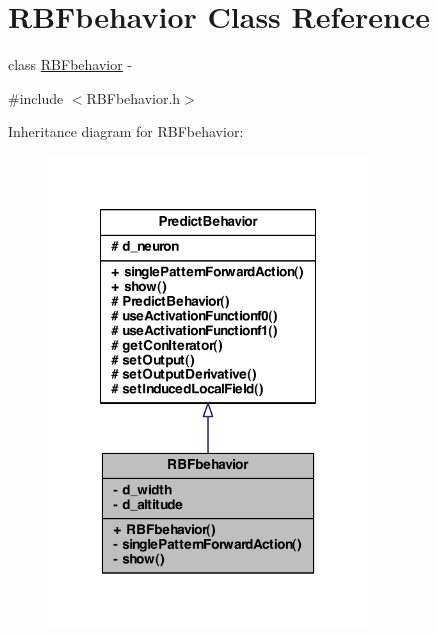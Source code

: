 \hypertarget{class_r_b_fbehavior}{
\section{RBFbehavior Class Reference}
\label{class_r_b_fbehavior}
}


class \hyperlink{class_r_b_fbehavior}{RBFbehavior} -\/  




{\ttfamily \#include $<$RBFbehavior.h$>$}



Inheritance diagram for RBFbehavior:
\nopagebreak
\begin{figure}[H]
\begin{center}
\leavevmode
\includegraphics[width=240pt]{class_r_b_fbehavior__inherit__graph}
\end{center}
\end{figure}


